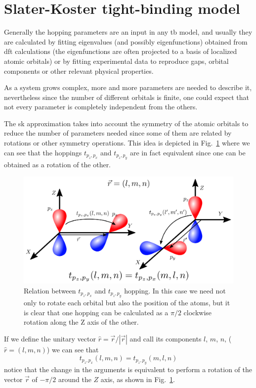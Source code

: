 \section{Slater-Koster tight-binding model}
\label{sec:SK}
Generally the hopping parameters are an input in any \ac{tb} model, and usually they are calculated by fitting eigenvalues (and possibly eigenfunctions) obtained from \ac{dft} calculations (the eigenfunctions are often projected to a basis of localized atomic orbitals) or by fitting experimental data to reproduce gaps, orbital components or other relevant physical properties.

As a system grows complex, more and more parameters are needed to describe it, nevertheless since the number of different orbitals is finite, one could expect that not every parameter is completely independent from the others.


The \ac{sk} approximation\cite{Slater1954} takes into account the symmetry of the atomic orbitals to reduce the number of parameters needed since some of them are related by rotations or other symmetry operations.
This idea is depicted in Fig.~\ref{complex} where we can see that the hoppings $t_{p_{z},p_{x}}$ and $t_{p_{z},p_{y}}$ are in fact equivalent since one can be obtained as a rotation of the other.
\begin{figure}[h!]
  \centering
  \includegraphics{chapter04/figures/complex.png}
  \vspace{-5pt}
  \caption{Relation between $t_{p_{z},p_{x}}$ and $t_{p_{z},p_{y}}$ hopping. In this case we need not only to rotate each orbital but also the position of the atoms, but it is clear that one hopping can be calculated as a $\pi/2$ clockwise rotation along the Z axis of the other.}
  \label{complex}
\end{figure}
\FloatBarrier
If we define the unitary vector $\hat{r} = \vec{r}/|\vec{r}|$ and call its components $l$, $m$, $n$, ($\hat{r}=(l,m,n)$) we can see that
\begin{equation}
  t_{p_{z},p_{x}} (l,m,n) = t_{p_{z},p_{y}}(m,l,n)
\end{equation}
notice that the change in the arguments is equivalent to perform a rotation of the vector $\vec{r}$ of $-\pi/2$ around the $Z$ axis, as shown in Fig.~\ref{complex}.


